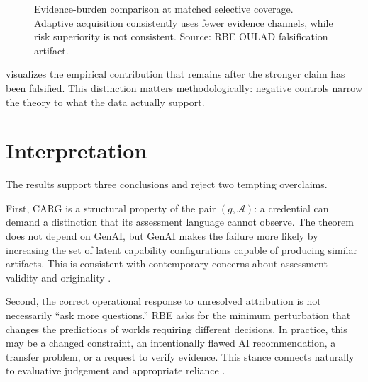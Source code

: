 \documentclass[11pt]{article}
\newcommand{\cA}{\mathcal{A}}
\begin{document}
\begin{figure}[t]
\centering
{}
\caption{Evidence-burden comparison at matched selective coverage. Adaptive acquisition consistently uses fewer evidence channels, while risk superiority is not consistent. Source: RBE OULAD falsification artifact.}
\label{fig:ouladburden}
\end{figure}

 visualizes the empirical contribution that remains after the stronger claim has been falsified. This distinction matters methodologically: negative controls narrow the theory to what the data actually support.

\section{Interpretation}
The results support three conclusions and reject two tempting overclaims.

First, CARG is a structural property of the pair $(g,\cA)$: a credential can demand a distinction that its assessment language cannot observe. The theorem does not depend on GenAI, but GenAI makes the failure more likely by increasing the set of latent capability configurations capable of producing similar artifacts. This is consistent with contemporary concerns about assessment validity and originality \parencite{luo2024policies,ali2026validity,bannister2025pandora}.

Second, the correct operational response to unresolved attribution is not necessarily ``ask more questions.'' RBE asks for the minimum perturbation that changes the predictions of worlds requiring different decisions. In practice, this may be a changed constraint, an intentionally flawed AI recommendation, a transfer problem, or a request to verify evidence. This stance connects naturally to evaluative judgement and appropriate reliance \parencite{bearman2024evaluative,passi2024reliance,zhai2024overreliance}.
\end{document}
